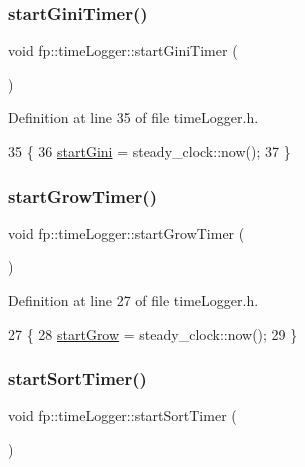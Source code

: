 \subsubsection{\texorpdfstring{start\+Gini\+Timer()}{startGiniTimer()}}
{\footnotesize\ttfamily void fp\+::time\+Logger\+::start\+Gini\+Timer (\begin{DoxyParamCaption}{ }\end{DoxyParamCaption})\hspace{0.3cm}{\ttfamily [inline]}}



Definition at line 35 of file time\+Logger.\+h.


\begin{DoxyCode}
35                                         \{
36                 \hyperlink{classfp_1_1timeLogger_abe0bd7eeb79ad8c33747afb4f4a99e88}{startGini} = steady\_clock::now();
37             \}
\end{DoxyCode}
\mbox{\label{classfp_1_1timeLogger_ab6ae96d6c08b46531417915f1b120060}} 
\subsubsection{\texorpdfstring{start\+Grow\+Timer()}{startGrowTimer()}}
{\footnotesize\ttfamily void fp\+::time\+Logger\+::start\+Grow\+Timer (\begin{DoxyParamCaption}{ }\end{DoxyParamCaption})\hspace{0.3cm}{\ttfamily [inline]}}



Definition at line 27 of file time\+Logger.\+h.


\begin{DoxyCode}
27                                         \{
28                 \hyperlink{classfp_1_1timeLogger_a530aa42af210e19fbab96c998271dbc4}{startGrow} = steady\_clock::now();
29             \}
\end{DoxyCode}
\mbox{\label{classfp_1_1timeLogger_a53d2260809f92b6884e6cbf4cdf89c2e}} 
\subsubsection{\texorpdfstring{start\+Sort\+Timer()}{startSortTimer()}}
{\footnotesize\ttfamily void fp\+::time\+Logger\+::start\+Sort\+Timer (\begin{DoxyParamCaption}{ }\end{DoxyParamCaption})\hspace{0.3cm}{\ttfamily [inline]}}



